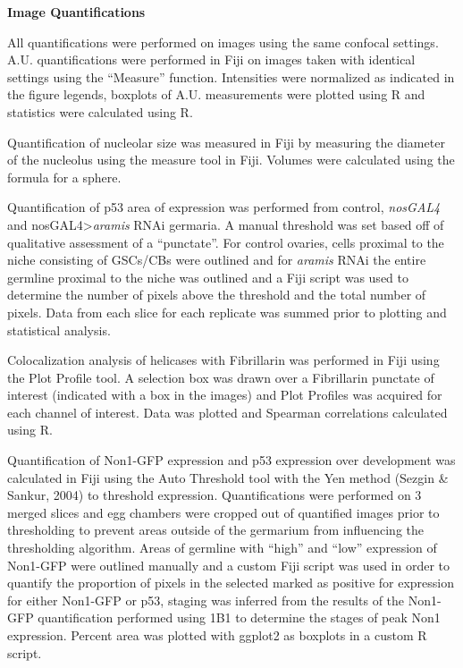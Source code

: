 \documentclass[12pt,oneside]{reedthesis}
\begin{document}
\textbf{Image Quantifications}

All quantifications were performed on images using the same confocal
settings. A.U. quantifications were performed in Fiji on images taken
with identical settings using the ``Measure'' function. Intensities were
normalized as indicated in the figure legends, boxplots of A.U.
measurements were plotted using R and statistics were calculated using
R.

Quantification of nucleolar size was measured in Fiji by measuring the
diameter of the nucleolus using the measure tool in Fiji. Volumes were
calculated using the formula for a sphere.

Quantification of p53 area of expression was performed from control,
\emph{nosGAL4} and nosGAL4\textgreater{}\emph{aramis} RNAi germaria. A manual threshold was
set based off of qualitative assessment of a ``punctate''. For control
ovaries, cells proximal to the niche consisting of GSCs/CBs were
outlined and for \emph{aramis} RNAi the entire germline proximal to the niche
was outlined and a Fiji script was used to determine the number of
pixels above the threshold and the total number of pixels. Data from
each slice for each replicate was summed prior to plotting and
statistical analysis.

Colocalization analysis of helicases with Fibrillarin was performed in
Fiji using the Plot Profile tool. A selection box was drawn over a
Fibrillarin punctate of interest (indicated with a box in the images)
and Plot Profiles was acquired for each channel of interest. Data was
plotted and Spearman correlations calculated using R.

Quantification of Non1-GFP expression and p53 expression over
development was calculated in Fiji using the Auto Threshold tool with
the Yen method (Sezgin \& Sankur, 2004) to threshold
expression. Quantifications were performed on 3 merged slices and egg
chambers were cropped out of quantified images prior to thresholding to
prevent areas outside of the germarium from influencing the thresholding
algorithm. Areas of germline with ``high'' and ``low'' expression of
Non1-GFP were outlined manually and a custom Fiji script was used in
order to quantify the proportion of pixels in the selected marked as
positive for expression for either Non1-GFP or p53, staging was inferred
from the results of the Non1-GFP quantification performed using 1B1 to
determine the stages of peak Non1 expression. Percent area was plotted
with ggplot2 as boxplots in a custom R script.
\end{document}
